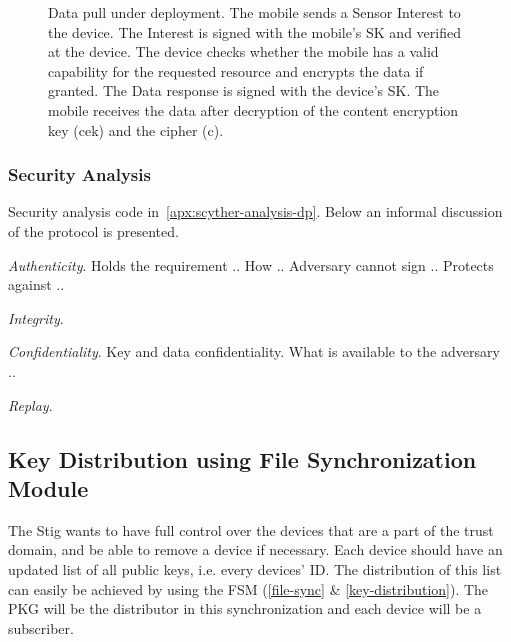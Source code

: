 \begin{figure}[H]
  \caption{Data pull under deployment. 
  The mobile sends a Sensor Interest to the device. 
  The Interest is signed with the mobile's SK and verified at the device. 
  The device checks whether the mobile has a valid capability for the requested resource and encrypts the data if granted.
  The Data response is signed with the device's SK.
  The mobile receives the data after decryption of the content encryption key (cek) and the cipher (c).}
  \label{fig:data_pull_ibe}
\end{figure}


\subsubsection{Security Analysis}
Security analysis code in~\autoref{apx:scyther-analysis-dp}. 
Below an informal discussion of the protocol is presented.

\textit{Authenticity}.
Holds the requirement ..
How ..
Adversary cannot sign ..
Protects against ..

\textit{Integrity}.

\textit{Confidentiality}. Key and data confidentiality.
What is available to the adversary ..


\textit{Replay}.

\subsection{Key Distribution using File Synchronization Module}

The Stig wants to have full control over the devices that are a part of the trust domain, and be able to remove a device if necessary.
Each device should have an updated list of all public keys, i.e. every devices' \gls{ID}.
The distribution of this list can easily be achieved by using the \gls{FSM} (\autoref{file-sync} \& \autoref{key-distribution}).
The \gls{PKG} will be the distributor in this synchronization and each device will be a subscriber.


